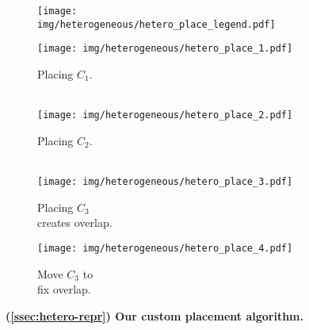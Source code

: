 \begin{figure}[H]
\centering
\vspace{-1em}
\captionsetup{justification=centering}
%
\begin{subfigure}{1.0 \columnwidth}
\centering
\texttt{[image: img/heterogeneous/hetero\_place\_legend.pdf]}
\vspace{-1.0em}
\end{subfigure}
%
\begin{subfigure}{0.24 \columnwidth}
\centering
\texttt{[image: img/heterogeneous/hetero\_place\_1.pdf]}
\caption{Placing $C_1$.\\~}
\label{fig:hetero-plac-1}
\end{subfigure}
%
\begin{subfigure}{0.24 \columnwidth}
\centering
\texttt{[image: img/heterogeneous/hetero\_place\_2.pdf]}
\caption{Placing $C_2$.\\~}
\label{fig:hetero-plac-2}
\end{subfigure}
%
\begin{subfigure}{0.24 \columnwidth}
\centering
\texttt{[image: img/heterogeneous/hetero\_place\_3.pdf]}
\caption{Placing $C_3$\\creates overlap.}
\label{fig:hetero-plac-3}
\end{subfigure}
%
\begin{subfigure}{0.24 \columnwidth}
\centering
\texttt{[image: img/heterogeneous/hetero\_place\_4.pdf]}
\caption{Move $C_3$ to\\fix overlap.}
\label{fig:hetero-plac-4}
\end{subfigure}
\vspace{-2em}
%
\caption{\textbf{(\textsection \ref{ssec:hetero-repr}) Our custom placement algorithm.}}
\label{fig:hetero-plac}
\vspace{-1em}
\end{figure}
